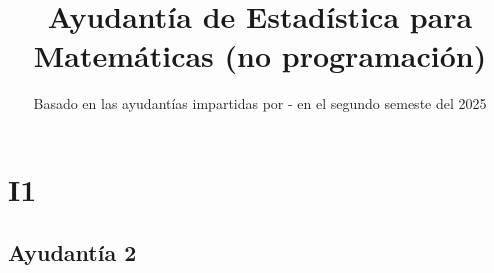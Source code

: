 \documentclass[a4paper]{report}
\title{Ayudantía de Estadística para Matemáticas (no programación)}
\author{}
\date{Basado en las ayudantías impartidas por - en el segundo semeste del 2025}
\begin{document}
    \maketitle
    \tableofcontents

    \chapter{I1}
    \setcounter{section}{0}
	\section{Ayudantía 2}

	




\end{document}
